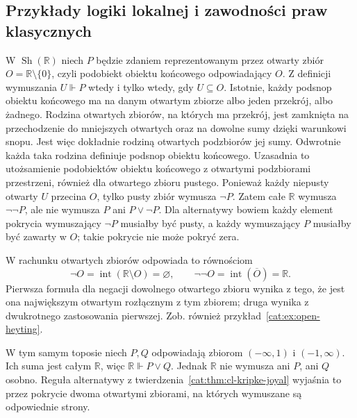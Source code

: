 \subsection{Przykłady logiki lokalnej i zawodności praw klasycznych}

\begin{przyklad}\label{cat:ex:cl-open-truth}
W $\operatorname{Sh}(\mathbb R)$ niech $P$ będzie zdaniem reprezentowanym przez otwarty zbiór $O=\mathbb R\setminus\{0\}$, czyli podobiekt obiektu końcowego odpowiadający $O$. Z definicji wymuszania $U\Vdash P$ wtedy i tylko wtedy, gdy $U\subseteq O$. Istotnie, każdy podsnop obiektu końcowego ma na danym otwartym zbiorze albo jeden przekrój, albo żadnego. Rodzina otwartych zbiorów, na których ma przekrój, jest zamknięta na przechodzenie do mniejszych otwartych oraz na dowolne sumy dzięki warunkowi snopu. Jest więc dokładnie rodziną otwartych podzbiorów jej sumy. Odwrotnie każda taka rodzina definiuje podsnop obiektu końcowego. Uzasadnia to utożsamienie podobiektów obiektu końcowego z otwartymi podzbiorami przestrzeni, również dla otwartego zbioru pustego. Ponieważ każdy niepusty otwarty $U$ przecina $O$, tylko pusty zbiór wymusza $\neg P$. Zatem całe $\mathbb R$ wymusza $\neg\neg P$, ale nie wymusza $P$ ani $P\vee\neg P$. Dla alternatywy bowiem każdy element pokrycia wymuszający $\neg P$ musiałby być pusty, a każdy wymuszający $P$ musiałby być zawarty w $O$; takie pokrycie nie może pokryć zera.

W rachunku otwartych zbiorów odpowiada to równościom
\[
 \neg O=\operatorname{int}(\mathbb R\setminus O)=\varnothing,
 \qquad
 \neg\neg O=\operatorname{int}(\overline O)=\mathbb R.
\]
Pierwsza formuła dla negacji dowolnego otwartego zbioru wynika z tego, że jest ona największym otwartym rozłącznym z tym zbiorem; druga wynika z dwukrotnego zastosowania pierwszej. Zob. również przykład~\ref{cat:ex:open-heyting}.
\end{przyklad}

\begin{przyklad}\label{cat:ex:cl-local-disjunction}
W tym samym toposie niech $P,Q$ odpowiadają zbiorom $(-\infty,1)$ i $(-1,\infty)$. Ich suma jest całym $\mathbb R$, więc $\mathbb R\Vdash P\vee Q$. Jednak $\mathbb R$ nie wymusza ani $P$, ani $Q$ osobno. Reguła alternatywy z twierdzenia~\ref{cat:thm:cl-kripke-joyal} wyjaśnia to przez pokrycie dwoma otwartymi zbiorami, na których wymuszane są odpowiednie strony.
\end{przyklad}

